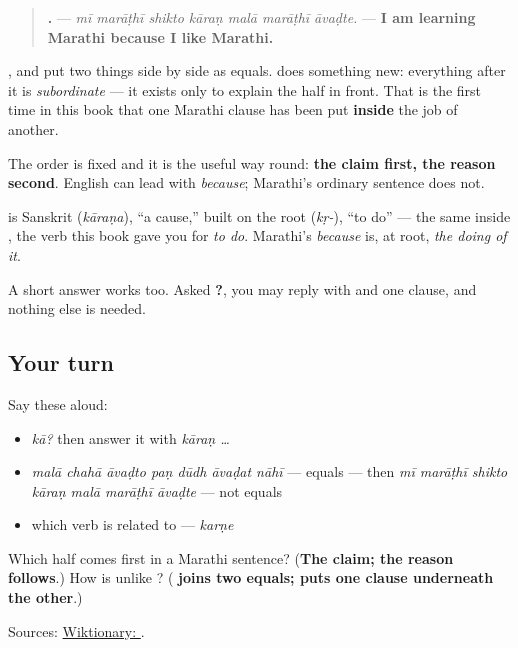 \begin{grammarlens}[title={Grammar Lens: \mr{कारण} takes a whole sentence after it}]
\begin{quote}
\textbf{      .} — \emph{mī marāṭhī shikto kāraṇ malā marāṭhī āvaḍte.} — \textbf{I am learning Marathi because I like Marathi.}
\end{quote}

\textbf{}, \textbf{} and \textbf{} put two things side by side as equals. \textbf{} does something new: everything after it is \emph{subordinate} — it exists only to explain the half in front. That is the first time in this book that one Marathi clause has been put \textbf{inside} the job of another.

The order is fixed and it is the useful way round: \textbf{the claim first, the reason second}. English can lead with \emph{because}; Marathi's ordinary sentence does not.

\textbf{} is Sanskrit \textbf{} (\emph{kāraṇa}), \textquotedblleft{}a cause,\textquotedblright{} built on the root \textbf{} (\emph{kṛ-}), \textquotedblleft{}to do\textquotedblright{} — the same \textbf{} inside \textbf{}, the verb this book gave you for \emph{to do}. Marathi's \emph{because} is, at root, \emph{the doing of it}.

A short answer works too. Asked \textbf{?}, you may reply with \textbf{} and one clause, and nothing else is needed.
\end{grammarlens}

\subsection*{Your turn}
Say these aloud:

\begin{itemize}
\raggedright
  \item \emph{kā?} then answer it with \emph{kāraṇ …}
  \item \emph{malā chahā āvaḍto paṇ dūdh āvaḍat nāhī} — equals — then \emph{mī marāṭhī shikto kāraṇ malā marāṭhī āvaḍte} — not equals
  \item which verb \textbf{} is related to — \emph{karṇe}
\end{itemize}

\begin{tcolorbox}[breakable,colback=teal!4,colframe=teal!35!black,title={Before you move on}]
Which half comes first in a Marathi \textbf{} sentence? (\textbf{The claim; the reason follows}.) How is \textbf{} unlike \textbf{}? (\textbf{ joins two equals;  puts one clause underneath the other}.)

Sources: \href{https://en.wiktionary.org/wiki/\%E0\%A4\%95\%E0\%A4\%BE\%E0\%A4\%B0\%E0\%A4\%A3}{Wiktionary: }.
\end{tcolorbox}
